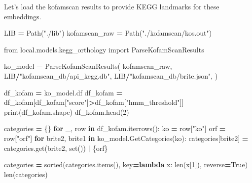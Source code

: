 \documentclass[
]{book}
\newenvironment{Shaded}{\begin{snugshade}}{\end{snugshade}}
\newcommand{\BuiltInTok}[1]{#1}
\newcommand{\ControlFlowTok}[1]{\textcolor[rgb]{0.13,0.29,0.53}{\textbf{#1}}}
\newcommand{\DecValTok}[1]{\textcolor[rgb]{0.00,0.00,0.81}{#1}}
\newcommand{\ImportTok}[1]{#1}
\newcommand{\KeywordTok}[1]{\textcolor[rgb]{0.13,0.29,0.53}{\textbf{#1}}}
\newcommand{\NormalTok}[1]{#1}
\newcommand{\OperatorTok}[1]{\textcolor[rgb]{0.81,0.36,0.00}{\textbf{#1}}}
\newcommand{\StringTok}[1]{\textcolor[rgb]{0.31,0.60,0.02}{#1}}
\newcommand{\VariableTok}[1]{\textcolor[rgb]{0.00,0.00,0.00}{#1}}
\begin{document}
Let's load the kofamscan results to provide KEGG landmarks for these embeddings.

\begin{Shaded}
\begin{Highlighting}[numbers=left,,]
\NormalTok{LIB }\OperatorTok{=}\NormalTok{ Path(}\StringTok{"./lib"}\NormalTok{)}
\NormalTok{kofamscan\_raw }\OperatorTok{=}\NormalTok{ Path(}\StringTok{"./kofamscan/kos.out"}\NormalTok{)}
\end{Highlighting}
\end{Shaded}

\begin{Shaded}
\begin{Highlighting}[numbers=left,,]
\ImportTok{from}\NormalTok{ local.models.kegg\_orthology }\ImportTok{import}\NormalTok{ ParseKofamScanResults}

\NormalTok{ko\_model }\OperatorTok{=}\NormalTok{ ParseKofamScanResults(}
\NormalTok{    kofamscan\_raw,}
\NormalTok{    LIB}\OperatorTok{/}\StringTok{"kofamscan\_db/api\_kegg.db"}\NormalTok{,}
\NormalTok{    LIB}\OperatorTok{/}\StringTok{"kofamscan\_db/brite.json"}\NormalTok{,}
\NormalTok{)}
\end{Highlighting}
\end{Shaded}

\begin{Shaded}
\begin{Highlighting}[numbers=left,,]
\NormalTok{df\_kofam }\OperatorTok{=}\NormalTok{ ko\_model.df}
\NormalTok{df\_kofam }\OperatorTok{=}\NormalTok{ df\_kofam[df\_kofam[}\StringTok{"score"}\NormalTok{]}\OperatorTok{\textgreater{}}\NormalTok{df\_kofam[}\StringTok{"hmm\_threshold"}\NormalTok{]]}
\BuiltInTok{print}\NormalTok{(df\_kofam.shape)}
\NormalTok{df\_kofam.head(}\DecValTok{2}\NormalTok{)}
\end{Highlighting}
\end{Shaded}

\begin{Shaded}
\begin{Highlighting}[numbers=left,,]
\NormalTok{categories }\OperatorTok{=}\NormalTok{ \{\}}
\ControlFlowTok{for}\NormalTok{ \_, row }\KeywordTok{in}\NormalTok{ df\_kofam.iterrows():}
\NormalTok{    ko }\OperatorTok{=}\NormalTok{ row[}\StringTok{"ko"}\NormalTok{]}
\NormalTok{    orf }\OperatorTok{=}\NormalTok{ row[}\StringTok{"orf"}\NormalTok{]}
    \ControlFlowTok{for}\NormalTok{ brite2, brite1 }\KeywordTok{in}\NormalTok{ ko\_model.GetCategories(ko):}
\NormalTok{        categories[brite2] }\OperatorTok{=}\NormalTok{ categories.get(brite2, }\BuiltInTok{set}\NormalTok{()) }\OperatorTok{|}\NormalTok{ \{orf\}}

\NormalTok{categories }\OperatorTok{=} \BuiltInTok{sorted}\NormalTok{(categories.items(), key}\OperatorTok{=}\KeywordTok{lambda}\NormalTok{ x: }\BuiltInTok{len}\NormalTok{(x[}\DecValTok{1}\NormalTok{]), reverse}\OperatorTok{=}\VariableTok{True}\NormalTok{)}
\BuiltInTok{len}\NormalTok{(categories)}
\end{Highlighting}
\end{Shaded}
\end{document}
